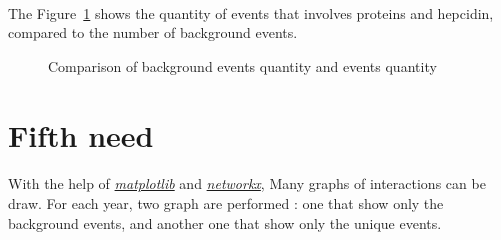 \documentclass{report} %
\begin{document}
        \paragraph*{}
        The Figure~\ref{fig:backgroundQuantification} shows the quantity of events that involves proteins and hepcidin, compared 
        to the number of background events.\\
        \begin{figure}[H] 
                \centering
                \caption{Comparison of background events quantity and events quantity}
                \label{fig:backgroundQuantification}
        \end{figure}



\newpage
\section{Fifth need}
        \paragraph*{}
        With the help of \href{http://matplotlib.org/}{\textit{matplotlib}} and \href{https://networkx.github.io/}{\textit{networkx}},
        Many graphs of interactions can be draw. For each year, two graph are performed : one that show only the background events, 
        and another one that show only the unique events.
\end{document}
